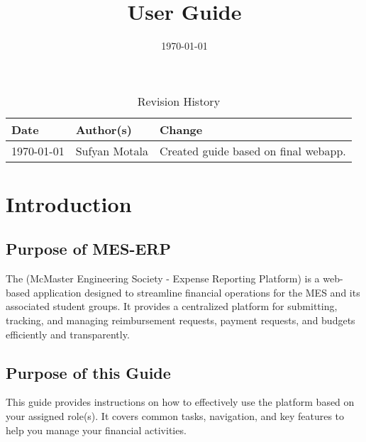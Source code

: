 \documentclass{article}
\title{User Guide\\\progname}
\author{\authname} %
\date{\today} %
\begin{document}
\maketitle

\begin{table}[hp]
\caption{Revision History} \label{TblRevisionHistory}
\begin{tabularx}{\textwidth}{p{3cm}p{4cm}X} %
\toprule
\textbf{Date} & \textbf{Author(s)} & \textbf{Change}\\
\midrule
\today & Sufyan Motala & Created guide based on final webapp.\\
\bottomrule
\end{tabularx}
\end{table}

\newpage

\tableofcontents

\newpage


\section{Introduction}

\subsection{Purpose of MES-ERP}
The \progname{} (McMaster Engineering Society - Expense Reporting Platform) is a web-based application designed to streamline financial operations for the MES and its associated student groups. It provides a centralized platform for submitting, tracking, and managing reimbursement requests, payment requests, and budgets efficiently and transparently.

\subsection{Purpose of this Guide}
This guide provides instructions on how to effectively use the \progname{} platform based on your assigned role(s). It covers common tasks, navigation, and key features to help you manage your financial activities.
\end{document}
